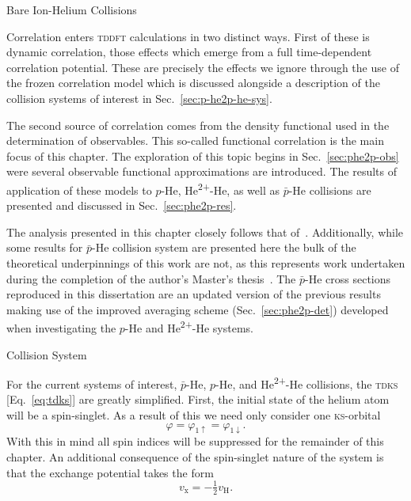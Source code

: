 \documentclass[letterpaper, 11 pt]{report}
\begin{document}
\begin{chapter}{Bare Ion-Helium Collisions \label{chap:p-he2p-he}}

   Correlation enters \textsc{tddft} calculations in two distinct ways. First of these is dynamic
   correlation, those effects which emerge from a full time-dependent correlation potential. These are
   precisely the effects we ignore through the use of the frozen correlation model which is discussed
   alongside a description of the collision systems of interest in Sec.~\ref{sec:p-he2p-he-sys}.

   The second source of correlation comes from the density functional
   used in the determination of observables. This so-called functional correlation is the main focus of
   this chapter. The exploration of this topic begins in Sec.~\ref{sec:phe2p-obs} were several
   observable functional approximations are introduced. The results of application of these models to
   $p$-He, He\textsuperscript{2+}-He, as well as $\bar{p}$-He collisions are presented and discussed in
   Sec.~\ref{sec:phe2p-res}.

   The analysis presented in this chapter closely follows that of~\cite{p-he2p-he}. Additionally, while
   some results for $\bar{p}$-He collision system are presented here the bulk of the theoretical
   underpinnings of this work are not, as this represents work undertaken during the completion of the
   author's Master's thesis~\cite{thesis}. The $\bar{p}$-He cross sections reproduced in this
   dissertation are an updated version of the previous results making use of the improved averaging
   scheme (Sec.~\ref{sec:phe2p-det}) developed when investigating the $p$-He and
   He\textsuperscript{2+}-He systems.

   \begin{section}{Collision System \label{sec:p-he2p-he-sys}}

      For the current systems of interest, $\bar{p}$-He, $p$-He, and He\textsuperscript{2+}-He
      collisions, the \textsc{tdks} [Eq.~\eqref{eq:tdks}] are greatly simplified. First, the initial
      state of the helium atom will be a spin-singlet. As a result of this we need only consider one
      \textsc{ks}-orbital
      \begin{equation} \label{eq:oneorb}
         \varphi = \varphi_{1\uparrow} = \varphi_{1\downarrow}.
      \end{equation}
      With this in mind all spin indices will be suppressed for the remainder of this chapter. An
      additional consequence of the spin-singlet nature of the system is that the exchange potential
      takes the form
      \begin{equation} \label{eq:vxvh}
         v_\mathrm{x} = - \tfrac{1}{2} v_\mathrm{H}.
      \end{equation}


\end{section}
\end{chapter}
\end{document}
